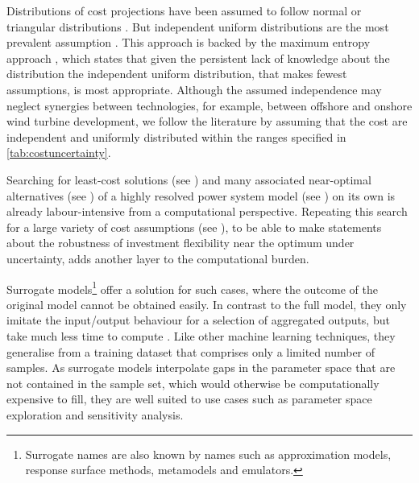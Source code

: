 Distributions of cost projections have been assumed to follow normal
\cite{mavromatidis_uncertainty_2018} or triangular distributions
\cite{li_using_2020}. But independent uniform distributions are the most
prevalent assumption
\cite{moret_characterization_2017,moret_robust_2016,shirizadeh_how_2019,trondle_trade-offs_2020,pilpola_analyzing_2020,Li2017,Trutnevyte2013,lopion_cost_2019}.
This approach is backed by the maximum entropy approach
\cite{trondle_trade-offs_2020}, which states that given the persistent lack of knowledge
about the distribution the independent uniform distribution, that makes fewest
assumptions, is most appropriate. Although the assumed independence may neglect
synergies between technologies, for example, between offshore and onshore wind
turbine development, we follow the literature by assuming that the cost are
independent and uniformly distributed within the ranges specified in
\cref{tab:costuncertainty}.



Searching for least-cost solutions (see ) and many associated near-optimal alternatives (see ) of a highly resolved power system model (see ) on its own
is already labour-intensive from a computational perspective.
Repeating this search for a large variety of cost assumptions (see ),
to be able to make statements about the robustness of
investment flexibility near the optimum under uncertainty,
adds another layer to the computational burden.


Surrogate models\footnote{Surrogate names are also known by names such as approximation models, response surface methods, metamodels and emulators.}
offer a solution for such cases, where the outcome of the
original model cannot be obtained easily.
In contrast to the full model, they only imitate the input/output behaviour for a selection of aggregated outputs, but take much less time to compute \cite{palar_multi-fidelity_2016}.
Like other machine learning techniques, they generalise from a
training dataset that comprises only a limited number of samples.
As surrogate models interpolate gaps in the parameter space that are not contained in the sample set,
which would otherwise be computationally expensive to fill,
they are well suited to use cases such as parameter space exploration and sensitivity analysis.

